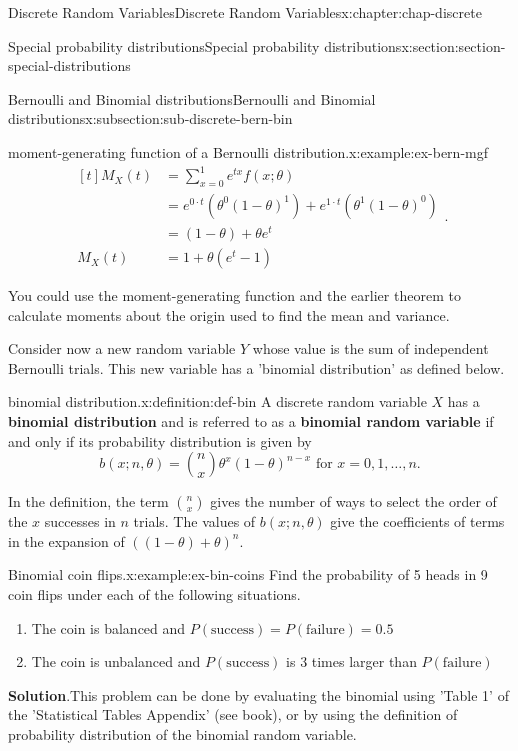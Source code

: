 \documentclass[oneside,10pt,]{book}
\newcommand{\blocktitlefont}{\relax}
\newcommand{\terminology}[1]{\textbf{#1}}
\newcommand{\amp}{&}
\begin{document}
\begin{chapterptx}{Discrete Random Variables}{}{Discrete Random Variables}{}{}{x:chapter:chap-discrete}
\begin{sectionptx}{Special probability distributions}{}{Special probability distributions}{}{}{x:section:section-special-distributions}
\begin{subsectionptx}{Bernoulli and Binomial distributions}{}{Bernoulli and Binomial distributions}{}{}{x:subsection:sub-discrete-bern-bin}
\begin{example}{moment-generating function of a Bernoulli distribution.}{x:example:ex-bern-mgf}
\begin{equation*}
\begin{aligned}[t]
M_X(t) \amp = \sum_{x=0}^1 e^{tx} f(x; \theta)\\
\amp = e^{0\cdot t}\left(\theta^0(1-\theta)^1\right) + e^{1\cdot
t}\left(\theta^1(1-\theta)^0\right)\\
\amp = (1-\theta) + \theta e^t\\
M_X(t) \amp = 1 + \theta (e^t-1)
\end{aligned}\text{.}
\end{equation*}
%
\end{example}
You could use the moment-generating function and the earlier theorem to calculate moments about the origin used to find the mean and variance.%
\par
Consider now a new random variable \(Y\) whose value is the sum of independent Bernoulli trials. This new variable has a 'binomial distribution' as defined below.%
\begin{definition}{binomial distribution.}{x:definition:def-bin}%
A discrete random variable \(\displaystyle X\) has a \terminology{binomial distribution} and is referred to as a \terminology{binomial random variable} if and only if its probability distribution is given by%
\begin{equation*}
b(x; n, \theta) = {n\choose
x}\theta^x(1-\theta)^{n-x} \text{ for }x = 0, 1, \dots, n\text{.}
\end{equation*}
%
\end{definition}
In the definition, the term \(\displaystyle {n \choose x}\) gives the number of ways to select the order of the \(x\) successes in \(n\) trials. The values of \(b(x; n, \theta)\) give the coefficients of terms in the expansion of \(\displaystyle
\left((1-\theta) + \theta\right)^n\).%
\begin{example}{Binomial coin flips.}{x:example:ex-bin-coins}%
Find the probability of 5 heads in 9 coin flips under each of the following situations.%
\begin{enumerate}
\item{}The coin is balanced and \(P(\text{success}) = P(\text{failure}) =
0.5\)%
\item{}The coin is unbalanced and \(P(\text{success})\) is \(3\) times larger than \(P(\text{failure})\)%
\end{enumerate}
%
\textbf{\blocktitlefont Solution}.\quad{}This problem can be done by evaluating the binomial using 'Table 1' of the 'Statistical Tables Appendix' (see book), or by using the definition of probability distribution of the binomial random variable. %

\end{example}
\end{subsectionptx}
\end{sectionptx}
\end{chapterptx}
\end{document}
